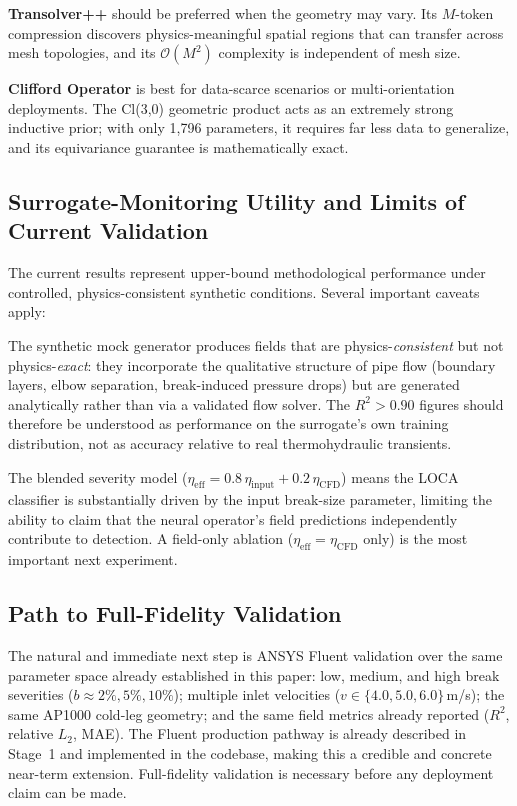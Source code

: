\documentclass[conference]{IEEEtran}
\begin{document}
\textbf{Transolver++} should be preferred when the geometry may vary. Its $M$-token compression discovers physics-meaningful spatial regions that can transfer across mesh topologies, and its $\mathcal{O}(M^2)$ complexity is independent of mesh size.

\textbf{Clifford Operator} is best for data-scarce scenarios or multi-orientation deployments. The Cl(3,0) geometric product acts as an extremely strong inductive prior; with only 1,796 parameters, it requires far less data to generalize, and its equivariance guarantee is mathematically exact.

\subsection{Surrogate-Monitoring Utility and Limits of Current Validation}

The current results represent upper-bound methodological performance under controlled, physics-consistent synthetic conditions. Several important caveats apply:

The synthetic mock generator produces fields that are physics-\emph{consistent} but not physics-\emph{exact}: they incorporate the qualitative structure of pipe flow (boundary layers, elbow separation, break-induced pressure drops) but are generated analytically rather than via a validated flow solver. The $R^2 > 0.90$ figures should therefore be understood as performance on the surrogate's own training distribution, not as accuracy relative to real thermohydraulic transients.

The blended severity model ($\eta_\text{eff} = 0.8\,\eta_\text{input} + 0.2\,\eta_\text{CFD}$) means the LOCA classifier is substantially driven by the input break-size parameter, limiting the ability to claim that the neural operator's field predictions independently contribute to detection. A field-only ablation ($\eta_\text{eff} = \eta_\text{CFD}$ only) is the most important next experiment.

\subsection{Path to Full-Fidelity Validation}

The natural and immediate next step is ANSYS Fluent validation over the same parameter space already established in this paper: low, medium, and high break severities ($b \approx 2\%, 5\%, 10\%$); multiple inlet velocities ($v \in \{4.0, 5.0, 6.0\}$\,m/s); the same AP1000 cold-leg geometry; and the same field metrics already reported ($R^2$, relative $L_2$, MAE). The Fluent production pathway is already described in Stage~1 and implemented in the codebase, making this a credible and concrete near-term extension. Full-fidelity validation is necessary before any deployment claim can be made.
\end{document}
